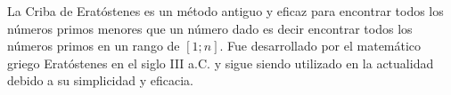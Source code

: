 La Criba de Eratóstenes es un método antiguo y eficaz para encontrar todos los números primos menores que un número dado es decir encontrar todos los números primos en un rango de $[1;n]$. Fue desarrollado por el matemático griego Eratóstenes en el siglo III a.C. y sigue siendo utilizado en la actualidad debido a su simplicidad y eficacia.